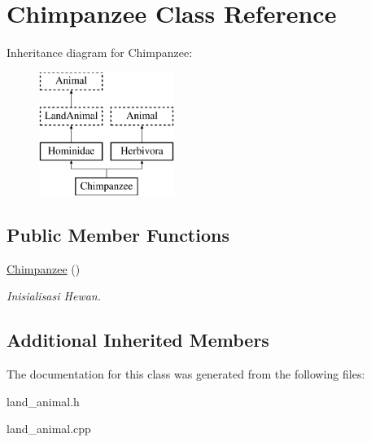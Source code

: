 \hypertarget{class_chimpanzee}{}\section{Chimpanzee Class Reference}
\label{class_chimpanzee}
Inheritance diagram for Chimpanzee\+:\begin{figure}[H]
\begin{center}
\leavevmode
\includegraphics[height=4.000000cm]{class_chimpanzee}
\end{center}
\end{figure}
\subsection*{Public Member Functions}
\begin{DoxyCompactItemize}
\item 
\hyperlink{class_chimpanzee_a109d3901d1da88fd18fa84a5e9310a57}{Chimpanzee} ()\hypertarget{class_chimpanzee_a109d3901d1da88fd18fa84a5e9310a57}{}\label{class_chimpanzee_a109d3901d1da88fd18fa84a5e9310a57}

\begin{DoxyCompactList}\small\item\em Inisialisasi Hewan. \end{DoxyCompactList}\end{DoxyCompactItemize}
\subsection*{Additional Inherited Members}


The documentation for this class was generated from the following files\+:\begin{DoxyCompactItemize}
\item 
land\+\_\+animal.\+h\item 
land\+\_\+animal.\+cpp\end{DoxyCompactItemize}
